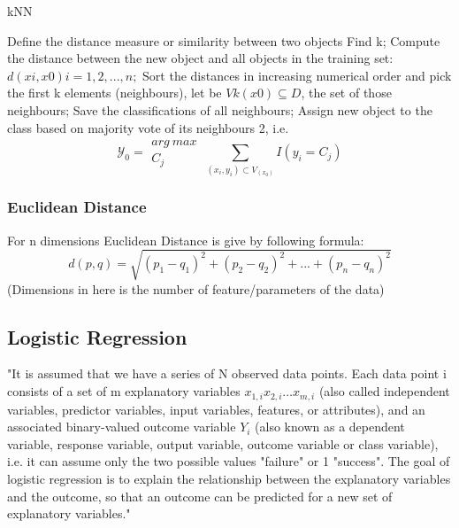 \documentclass[twoside]{article}
\begin{document}
\begin{multicols}{2}
\begin{algorithm*}[t]
\caption{kNN} %
\label{alg:KNN}
\begin{algorithmic} [1]
    \State Define the distance measure or similarity between two objects \label{1}
    \State Find k; \label{KNN-fnd-k}
    \State Compute the distance between the new object and all objects in the training set: $d(xi, x0) i = 1, 2, . . . , n;$
	\State Sort the distances in increasing numerical order and pick the first k elements (neighbours), let be $Vk (x0) \subseteq D$, the set of those neighbours;
    \State Save the classifications of all neighbours;
    \State Assign new object to the class based on majority vote of its
neighbours 2, i.e.	\[	\mathcal{Y}_0 = \substack{arg\ max\ \\ C_j} \sum_{(x_i,y_i)\subset V_(x_0)} I(y_i=C_j) \]
\end{algorithmic}
\end{algorithm*}
\subsubsection*{Euclidean Distance}
For n dimensions Euclidean Distance is give by following formula:
\[ d(p,q)= \sqrt{(p_1 - q_1)^2 + (p_2 - q_2)^2 + ... + (p_n - q_n)^2} \]
(Dimensions in here is the number of feature/parameters of the data)

\subsection*{Logistic Regression}
\indent \par
"It is assumed that we have a series of N observed data points. Each data point i consists of a set of m explanatory variables $x_{1,i} x_{2,i} \dots x_{m,i}$ (also called independent variables, predictor variables, input variables, features, or attributes), and an associated binary-valued outcome variable $Y_i$ (also known as a dependent variable, response variable, output variable, outcome variable or class variable), i.e. it can assume only the two possible values "failure" or 1 "success". The goal of logistic regression is to explain the relationship between the explanatory variables and the outcome, so that an outcome can be predicted for a new set of explanatory variables."




\end{multicols}
\end{document}
